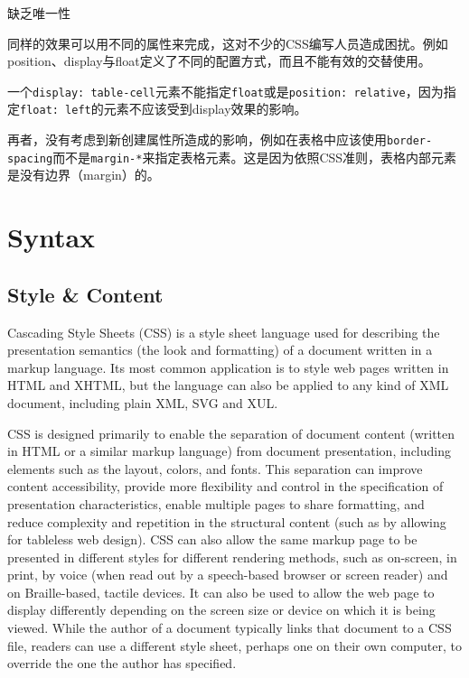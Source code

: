 \begin{compactitem}
\item 缺乏唯一性
\end{compactitem}

同样的效果可以用不同的属性来完成，这对不少的CSS编写人员造成困扰。例如position、display与float定义了不同的配置方式，而且不能有效的交替使用。

一个\texttt{display: table-cell}元素不能指定\texttt{float}或是\texttt{position: relative}，因为指定\texttt{float: left}的元素不应该受到display效果的影响。

再者，没有考虑到新创建属性所造成的影响，例如在表格中应该使用\texttt{border-spacing}而不是\texttt{margin-*}来指定表格元素。这是因为依照CSS准则，表格内部元素是没有边界（margin）的。






\chapter{Syntax}

\vspace{-30pt}

\section{Style \& Content}




Cascading Style Sheets (CSS)\cite{css} is a style sheet language used for describing the presentation semantics (the look and formatting) of a document written in a markup language. Its most common application is to style web pages written in HTML and XHTML, but the language can also be applied to any kind of XML document, including plain XML, SVG and XUL.

CSS is designed primarily to enable the separation of document content (written in HTML or a similar markup language) from document presentation, including elements such as the layout, colors, and fonts. This separation can improve content accessibility, provide more flexibility and control in the specification of presentation characteristics, enable multiple pages to share formatting, and reduce complexity and repetition in the structural content (such as by allowing for tableless web design). CSS can also allow the same markup page to be presented in different styles for different rendering methods, such as on-screen, in print, by voice (when read out by a speech-based browser or screen reader) and on Braille-based, tactile devices. It can also be used to allow the web page to display differently depending on the screen size or device on which it is being viewed. While the author of a document typically links that document to a CSS file, readers can use a different style sheet, perhaps one on their own computer, to override the one the author has specified.

